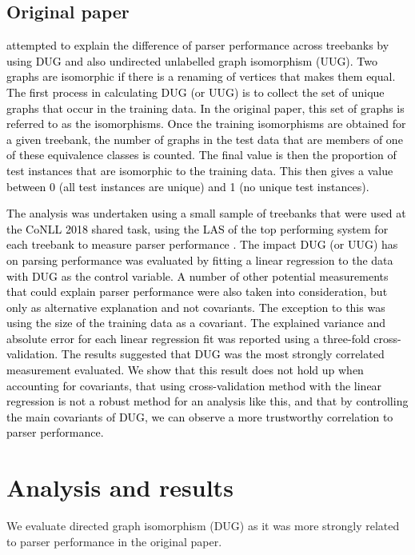 \documentclass[11pt,a4paper]{article}
\begin{document}
\subsection{Original paper}
\textcolor{black}{\citet{sogaard-2020-languages} attempted to explain the difference of parser performance across treebanks by using DUG and also undirected unlabelled graph isomorphism (UUG). Two graphs are isomorphic if there is a renaming of vertices that makes them equal. The first process in calculating DUG (or UUG) is to collect the set of unique graphs that occur in the training data. In the original paper, this set of graphs is referred to as the isomorphisms. Once the training isomorphisms are obtained for a given treebank, the number of graphs in the test data that are members of one of these equivalence classes is counted. The final value is then the proportion of test instances that are isomorphic to the training data. This then gives a value between 0 (all test instances are unique) and 1 (no unique test instances).}  

\textcolor{black}{The analysis was undertaken using a small sample of treebanks that were used at the CoNLL 2018 shared task, using the LAS of the top performing system for each treebank to measure parser performance \cite{zeman-conll18}. The impact DUG (or UUG) has on parsing performance was evaluated by fitting a linear regression to the data with DUG as the control variable. A number of other potential measurements that could explain parser performance were also taken into consideration, but only as alternative explanation and not covariants. The exception to this was using the size of the training data as a covariant. The explained variance and absolute error for each linear regression fit was reported using a three-fold cross-validation. The results suggested that DUG was the most strongly correlated measurement evaluated. We show that this result does not hold up when accounting for covariants, that using cross-validation method with the linear regression is not a robust method for an analysis like this, and that by controlling the main covariants of DUG, we can observe a more trustworthy correlation to parser performance.}
\section{Analysis and results}
We evaluate directed graph isomorphism (DUG) as it was more strongly related to parser performance in the original paper. 
\end{document}
